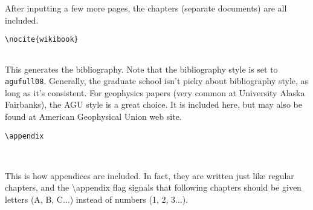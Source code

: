 After inputting a few more pages, the chapters (separate documents) are all
included.

\small
\begin{verbatim}
\nocite{wikibook}


\end{verbatim}
\normalsize

This generates the bibliography. Note that the bibliography style is set to
\texttt{agufull08}. Generally, the graduate school isn't picky about 
bibliography style, as long as it's consistent. For geophysics papers (very
common at University Alaska Fairbanks), the AGU style is a great choice. It is included here, but may
also be found at American Geophysical Union web site.

\small
\begin{verbatim}
\appendix



\end{verbatim}
\normalsize

This is how appendices are included. In fact, they are written just like
regular chapters, and the \textbackslash appendix flag signals that following
chapters should be given letters (A, B, C...) instead of numbers (1, 2, 3...).

